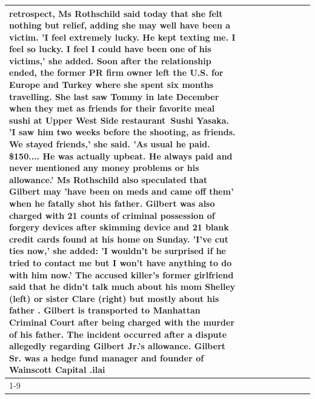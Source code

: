 \begin{table}[H]
\begin{tabular}{lllrlllll}
retrospect, Ms Rothschild said today that she felt nothing but relief, adding she may well have been a victim. 'I feel extremely lucky. He kept texting me. I feel so lucky. I feel I could have been one of his victims,' she added. Soon after the relationship ended, the former PR firm owner left the U.S. for Europe and Turkey where she spent six months  travelling. She last saw Tommy in late December when they met as friends for their favorite meal sushi at Upper West Side restaurant Sushi Yasaka. 'I saw him two weeks before the shooting, as friends. We stayed friends,' she said. 'As usual he paid. \$150.... He was actually upbeat. He always paid and never mentioned any money problems or his allowance.' Ms Rothschild also speculated that Gilbert may 'have been on meds and came off them' when he fatally shot his father. Gilbert was also charged with 21 counts of criminal possession of forgery devices after skimming device and 21 blank credit cards found at his home on Sunday. 'I've cut ties now,' she added: 'I wouldn’t be surprised if he tried to contact me but I won’t have anything to do with him now.' The accused killer's former girlfriend said that he didn't talk much about his mom Shelley (left) or sister Clare (right) but mostly about his father . Gilbert is transported to Manhattan Criminal Court  after being charged with the murder of his father. The incident occurred after a dispute allegedly regarding Gilbert Jr.'s allowance. Gilbert Sr. was a hedge fund manager and founder of Wainscott Capital .ilai \\
\cline{1-9}

\end{tabular}
\end{table}
